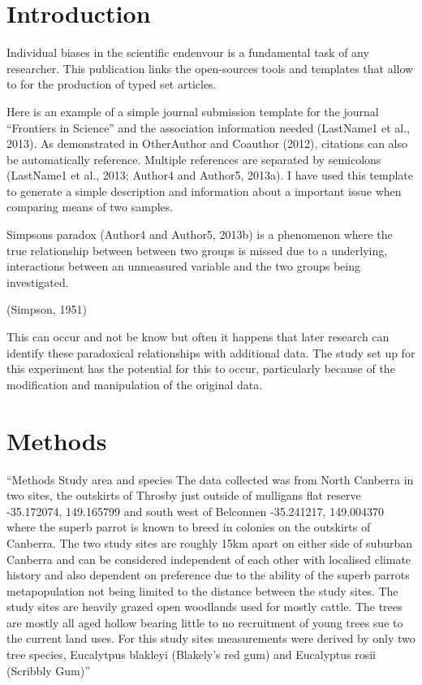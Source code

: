 \documentclass[utf8]{frontiersSCNS}
\begin{document}
\hypertarget{introduction}{%
\section*{Introduction}\label{introduction}}

Individual biases in the scientific endenvour is a fundamental task of
any researcher. This publication links the open-sources tools and
templates that allow to for the production of typed set articles.

Here is an example of a simple journal submission template for the
journal ``Frontiers in Science'' and the association information needed
(LastName1 et al., 2013). As demonstrated in OtherAuthor and Coauthor
(2012), citations can also be automatically reference. Multiple
references are separated by semicolons (LastName1 et al., 2013; Author4
and Author5, 2013a). I have used this template to generate a simple
description and information about a important issue when comparing means
of two samples.

Simpsons paradox (Author4 and Author5, 2013b) is a phenomenon where the
true relationship between between two groups is missed due to a
underlying, interactions between an unmeasured variable and the two
groups being investigated.

(Simpson, 1951)

This can occur and not be know but often it happens that later research
can identify these paradoxical relationships with additional data. The
study set up for this experiment has the potential for this to occur,
particularly because of the modification and manipulation of the
original data.

\hypertarget{methods}{%
\section*{Methods}\label{methods}}

``Methods Study area and species The data collected was from North
Canberra in two sites, the outskirts of Throsby just outside of
mulligans flat reserve -35.172074, 149.165799 and south west of
Belconnen -35.241217, 149.004370 where the superb parrot is known to
breed in colonies on the outskirts of Canberra. The two study sites are
roughly 15km apart on either side of suburban Canberra and can be
considered independent of each other with localised climate history and
also dependent on preference due to the ability of the superb parrots
metapopulation not being limited to the distance between the study
sites. The study sites are heavily grazed open woodlands used for mostly
cattle. The trees are mostly all aged hollow bearing little to no
recruitment of young trees sue to the current land uses. For this study
sites measurements were derived by only two tree species, Eucalytpus
blakleyi (Blakely's red gum) and Eucalyptus rosii (Scribbly Gum)''
\end{document}
